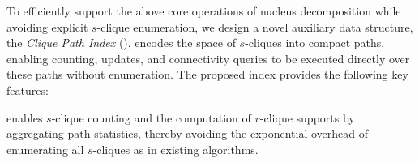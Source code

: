 

To efficiently support the above core operations of nucleus decomposition while avoiding explicit $s$-clique enumeration, we design a novel auxiliary data structure, the \textit{Clique Path Index} (\cpi), 
%
\cpi encodes the space of $s$-cliques into compact paths, enabling counting, updates, and connectivity queries to be executed directly over these paths without enumeration. 
%
The proposed index provides the following key features:

%
\cpi enables $s$-clique counting and the computation of $r$-clique supports by aggregating path statistics, thereby avoiding the exponential overhead of enumerating all $s$-cliques as in existing algorithms.

